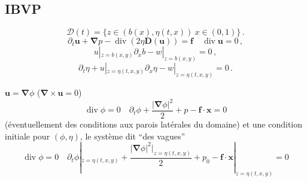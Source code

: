 \documentclass{article}
\theoremstyle{plain}
\numberwithin{equation}{section} %
\newcommand{\D}{\mathcal{D}}
\newcommand{\f}{\boldsymbol{f}}
\newcommand{\xx}{\boldsymbol{x}}
\renewcommand{\div}{\operatorname{div}}
\newcommand{\grad}{\boldsymbol{\nabla}}
\newcommand{\bu}{{\boldsymbol{u}}}
\def\Dbu{\boldsymbol{D}(\bu)}
\begin{document}
\subsection{IBVP}

$$
\D(t) = \{ z\in(b(x),\eta(t,x)) \ x \in (0,1) \} \,.
$$
\begin{equation}
\label{eq:Stokes}
 \partial_t \bu+ \grad p - \div(2\eta\Dbu) = \f \quad \div\bu = 0 \,,
\end{equation}
\begin{equation}
\label{eq:impermeabilite}
 u|_{z=b(x,y)}\partial_x b %
 - w|_{z=b(x,y)} = 0 \,,
\end{equation}
\begin{equation}
\label{eq:conditioncinematique}
 \partial_t\eta + u|_{z=\eta(t,x,y)}\partial_x \eta %
 - w|_{z=\eta(t,x,y)} = 0 \,.
\end{equation}

$\bu=\grad\phi$ ($\grad\times\bu=0$) %
\begin{equation}
 \label{eq:laplacebernoulli}
 \div \phi = 0 \quad \partial_t \phi + \frac{|\grad \phi|^2}2 + p - \f\cdot\xx = 0
\end{equation}
(\'eventuellement des conditions aux parois lat\'erales du domaine) et une condition initiale pour $(\phi,\eta)$, le syst\`eme dit ``des vagues''
\begin{equation}
 \label{eq:waterwave}
 \div \phi = 0 \quad \partial_t \phi|_{z=\eta(t,x,y)} + \frac{|\grad \phi|^2|_{z=\eta(t,x,y)}}2 + p_0 - \f\cdot\xx|_{z=\eta(t,x,y)} = 0
\end{equation}
\end{document}
